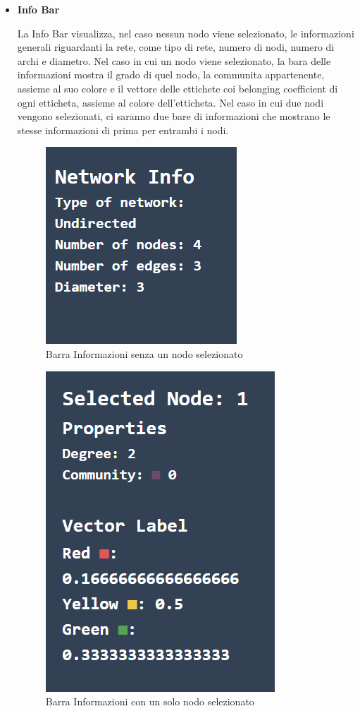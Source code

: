 \documentclass[a4paper,12pt]{report}
\begin{document}
\begin{itemize}
			\item \textbf{Info Bar} 

			La Info Bar visualizza, nel caso nessun nodo viene selezionato, le informazioni generali riguardanti la rete, come tipo di rete, numero di nodi, numero di archi e diametro. Nel caso in cui un nodo viene selezionato, la bara delle informazioni mostra il grado di quel nodo, la communita appartenente, assieme al suo colore e il vettore delle ettichete coi belonging coefficient di ogni etticheta, assieme al colore dell'etticheta. Nel caso in cui due nodi vengono selezionati, ci saranno due bare di informazioni che mostrano le stesse informazioni di prima per entrambi i nodi. 

			\begin{center}
				\begin{figure}[H]
				\centering
				\includegraphics[width=0.4\linewidth]{infobargeneral}
				\caption{Barra Informazioni senza un nodo selezionato}
				\end{figure}
				\begin{figure}[H]
				\centering
				\includegraphics[width=0.4\linewidth]{infobar1}
				\caption{Barra Informazioni con un solo nodo selezionato}
				\end{figure}
				\begin{figure}[H]

\end{figure}
\end{center}
\end{itemize}
\end{document}
